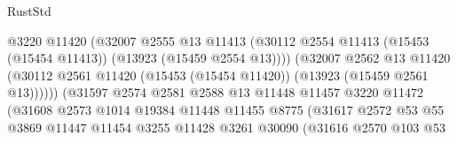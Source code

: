 \begin{lexlean}{RustStd}
\begin{coremodule}
                                          @3220
                                          @11420
                                          (@32007
                                            @2555
                                            @13
                                            @11413
                                            (@30112
                                              @2554
                                              @11413
                                              (@15453 (@15454 @11413))
                                              (@13923 (@15459 @2554 @13))))
                                          (@32007
                                            @2562
                                            @13
                                            @11420
                                            (@30112
                                              @2561
                                              @11420
                                              (@15453 (@15454 @11420))
                                              (@13923 (@15459 @2561 @13))))))
                                      (@31597
                                        @2574
                                        @2581
                                        @2588
                                        @13
                                        @11448
                                        @11457
                                        @3220
                                        @11472
                                        (@31608
                                          @2573
                                          @1014
                                          @19384
                                          @11448
                                          @11455
                                          @8775
                                          (@31617
                                            @2572
                                            @53
                                            @55
                                            @3869
                                            @11447
                                            @11454
                                            @3255
                                            @11428
                                            @3261
                                            @30090
                                            (@31616
                                              @2570
                                              @103
                                              @53

\end{coremodule}
\end{lexlean}
